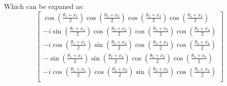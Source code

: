 \documentclass[12pt]{article}
\numberwithin{equation}{section}  %
\theoremstyle{definition}
\theoremstyle{plain}
\theoremstyle{remark}
\begin{document}
Which can be expaned as:
\begin{equation}
\begin{bmatrix}
\cos\left(\frac{\theta_1+x_1}{2}\right)
\cos\left(\frac{\theta_2+x_2}{2}\right)
\cos\left(\frac{\theta_3+x_3}{2}\right)
\cos\left(\frac{\theta_4+x_4}{2}\right)
\\[6pt]
-i\sin\left(\frac{\theta_1+x_1}{2}\right)
\cos\left(\frac{\theta_2+x_2}{2}\right)
\cos\left(\frac{\theta_3+x_3}{2}\right)
\cos\left(\frac{\theta_4+x_4}{2}\right)
\\[6pt]
-i\cos\left(\frac{\theta_1+x_1}{2}\right)
\sin\left(\frac{\theta_2+x_2}{2}\right)
\cos\left(\frac{\theta_3+x_3}{2}\right)
\cos\left(\frac{\theta_4+x_4}{2}\right)
\\[6pt]
-\sin\left(\frac{\theta_1+x_1}{2}\right)
\sin\left(\frac{\theta_2+x_2}{2}\right)
\cos\left(\frac{\theta_3+x_3}{2}\right)
\cos\left(\frac{\theta_4+x_4}{2}\right)
\\[6pt]
-i\cos\left(\frac{\theta_1+x_1}{2}\right)
\cos\left(\frac{\theta_2+x_2}{2}\right)
\sin\left(\frac{\theta_3+x_3}{2}\right)
\cos\left(\frac{\theta_4+x_4}{2}\right)
\\[6pt]


\end{bmatrix}
\end{equation}
\end{document}
